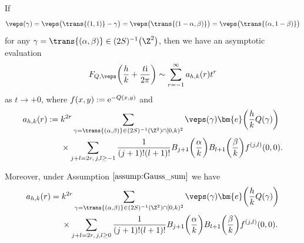 \begin{lem} \label{lem:Phi_asymptotic}
	If
	\begin{gather*}
	\veps(\gamma) = \veps\big(\trans{(1, 1)} - \gamma\big) = \veps\big(\trans{(1 - \alpha, \beta)}\big) = \veps\big(\trans{(\alpha, 1 - \beta)}\big)
	\end{gather*}
	for any $ \gamma = \trans{(\alpha, \beta)} \in (2S)^{-1}\big(\Z^2\big) $, then we have an asymptotic evaluation
	\begin{equation} \label{eq:Phi_asymptotic}
		F_{Q, \veps} \bigg( \frac{h}{k} + \frac{t{\rm i}}{2\pi} \bigg)
		\sim \sum_{r = -1}^{\infty} a_{h, k}(r) t^r
	\end{equation}
	as $ t \to +0 $, where $ f(x, y) := {\rm e}^{-Q(x, y)} $ and
	\begin{align*}
		a_{h, k}(r) :={}& k^{2r}
\sum_{\gamma = \trans{(\alpha, \beta)} \in (2S)^{-1}(\Z^2) \cap [0, k)^2} \veps(\gamma) \bm{e}\bigg(\frac{h}{k} Q(\gamma)\bigg)
\\
		&\times\sum_{j+l = 2r, \, j, l \ge -1} \frac{1}{(j+1)! (l+1)!} B_{j+1}\bigg( \frac{\alpha}{k} \bigg) B_{l+1}\bigg( \frac{\beta}{k} \bigg) f^{(j, l)}(0, 0).
	\end{align*}
	
	Moreover, under Assumption $ \ref{assump:Gauss_sum} $ we have
	\begin{align*}
		a_{h, k}(r) ={}& k^{2r}
\sum_{\gamma = \trans{(\alpha, \beta)} \in (2S)^{-1}(\Z^2) \cap [0, k)^2} \veps(\gamma) \bm{e}\bigg(\frac{h}{k} Q(\gamma)\bigg) \\
		&{}\times\sum_{j+l = 2r, \, j, l \ge 0} \frac{1}{(j+1)! (l+1)!} B_{j+1}\bigg( \frac{\alpha}{k} \bigg) B_{l+1}\bigg( \frac{\beta}{k} \bigg) f^{(j, l)}(0, 0).
	\end{align*}
\end{lem}

